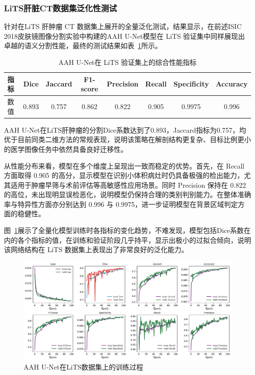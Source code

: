 \subsubsection{LiTS肝脏CT数据集泛化性测试}

针对在LiTS 肝肿瘤 CT 数据集上展开的全量泛化测试，结果显示，在前述ISIC 2018皮肤镜图像分割实验中构建的AAH U-Net模型在 LiTS 验证集中同样展现出卓越的语义分割性能，最终的测试结果如表~\ref{tab:lits_final_metrics}所示。

\begin{table}[!htbp]
    \centering
    \caption{AAH U-Net在 LiTS 验证集上的综合性能指标}
    \label{tab:lits_final_metrics}
    \begin{tabular}{lccccccc}
        \toprule
        指标 & Dice & Jaccard & F1-score & Precision & Recall & Specificity & Accuracy \\
        \midrule
        数值 & 0.893 & 0.757 & 0.862 & 0.822 & 0.905 & 0.9975 & 0.996\\
        \bottomrule
    \end{tabular}
\end{table}

AAH U-Net在LiTS肝肿瘤的分割Dice系数达到了0.893，Jaccard指标为0.757，均优于目前同类二维方法的常规表现，说明该策略在解剖结构更复杂、目标比例更小的医学图像任务中依然具备良好迁移性。

从性能分布来看，模型在多个维度上呈现出一致而稳定的优势。首先，在 Recall 方面取得 0.905 的高分，显示模型在识别小体积病灶时仍具备极强的检出能力，尤其适用于肿瘤早筛与术前评估等高敏感性应用场景。同时 Precision 保持在 0.822 的高位，未出现明显误检恶化，说明模型仍保持合理的类别判别能力。在整体准确率与特异性方面亦分别达到 0.996 与 0.9975，进一步证明模型在背景区域判定方面的稳健性。

图~\ref{fig:LITS_fanhua}展示了全量化模型训练时各指标的变化趋势，不难发现，模型包括Dice系数在内的各个指标的值，在训练和验证阶段几乎持平，显示出极小的过拟合倾向，说明该网络结构在 LiTS 数据集上表现出了非常良好的泛化能力。

\begin{figure}[!h]
    \centering
    \includegraphics[width=\textwidth]{fig/LITS_fanhua.pdf}
    \caption{AAH U-Net在LiTS数据集上的训练过程}
    \label{fig:LITS_fanhua}
\end{figure}

